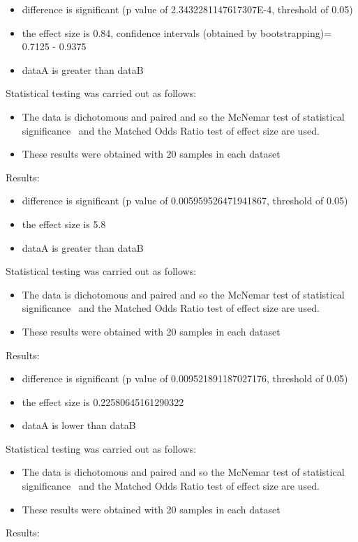 \documentclass[]{article}
\begin{document}
\begin{itemize}
\item{difference is significant (p value of 2.3432281147617307E-4, threshold of 0.05)}
\item{the effect size is 0.84, confidence intervals (obtained by bootstrapping)= 0.7125 - 0.9375}
\item{dataA is greater than dataB}
\end{itemize}Statistical testing was carried out as follows: \begin{itemize}
\item{The data is dichotomous and paired and so the McNemar test of statistical significance~\cite{Gibbons2011} and the Matched Odds Ratio test of effect size are used.}
\item{These results were obtained with 20 samples in each dataset}
\end{itemize}Results:
\begin{itemize}
\item{difference is significant (p value of 0.005959526471941867, threshold of 0.05)}
\item{the effect size is 5.8}
\item{dataA is greater than dataB}
\end{itemize}Statistical testing was carried out as follows: \begin{itemize}
\item{The data is dichotomous and paired and so the McNemar test of statistical significance~\cite{Gibbons2011} and the Matched Odds Ratio test of effect size are used.}
\item{These results were obtained with 20 samples in each dataset}
\end{itemize}Results:
\begin{itemize}
\item{difference is significant (p value of 0.009521891187027176, threshold of 0.05)}
\item{the effect size is 0.22580645161290322}
\item{dataA is lower than dataB}
\end{itemize}Statistical testing was carried out as follows: \begin{itemize}
\item{The data is dichotomous and paired and so the McNemar test of statistical significance~\cite{Gibbons2011} and the Matched Odds Ratio test of effect size are used.}
\item{These results were obtained with 20 samples in each dataset}
\end{itemize}Results:
\end{document}
